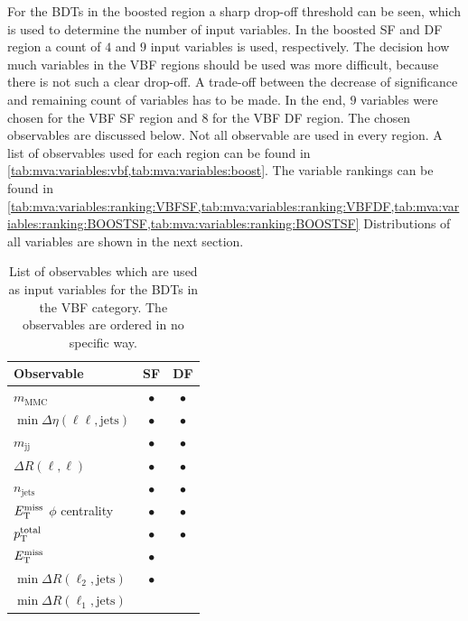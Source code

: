 For the BDTs in the boosted region a sharp drop-off threshold can be seen, which is used to determine the number
of input variables.
In the boosted SF and DF region a count of $4$ and $9$ input variables is used, respectively.
The decision how much variables in the VBF regions should be used was more difficult, because there is not such a clear drop-off.
A trade-off between the decrease of significance and remaining count of variables has to be made.
In the end, $9$ variables were chosen for the VBF SF region and $8$ for the VBF DF region.
The chosen observables are discussed below.
Not all observable are used in every region.
A list of observables used for each region can be found in \cref{tab:mva:variables:vbf,tab:mva:variables:boost}.
The variable rankings can be found in \cref{tab:mva:variables:ranking:VBFSF,tab:mva:variables:ranking:VBFDF,tab:mva:variables:ranking:BOOSTSF,tab:mva:variables:ranking:BOOSTSF}
Distributions of all variables are shown in the next section.

\begin{table}[htpb]
    \centering
    \caption{List of observables which are used as input variables for the BDTs in the VBF category.
             The observables are ordered in no specific way.}\label{tab:mva:variables:vbf}
    \begin{tabular}{lcc}
        \toprule
        Observable                                  & SF        & DF        \\ \midrule
        $m_\text{MMC}$                              & $\bullet$ & $\bullet$ \\
        $\min \Delta \eta (\ell\ell, \text{jets})$  & $\bullet$ & $\bullet$ \\
        $m_\text{jj}$                               & $\bullet$ & $\bullet$ \\
        $\Delta R(\ell,\ell)$                       & $\bullet$ & $\bullet$ \\
        $n_\text{jets}$                             & $\bullet$ & $\bullet$ \\
        $E_\text{T}^\text{miss}$ $\phi$ centrality                 & $\bullet$ & $\bullet$ \\
        $p_\text{T}^\text{total}$                          & $\bullet$ & $\bullet$ \\
        $E_\text{T}^\text{miss}$                                   & $\bullet$ &           \\
        $\min \Delta R (\ell_2, \text{jets})$       & $\bullet$ &           \\
        $\min \Delta R (\ell_1, \text{jets})$       &           &           \\
        \bottomrule
    \end{tabular}
\end{table}

